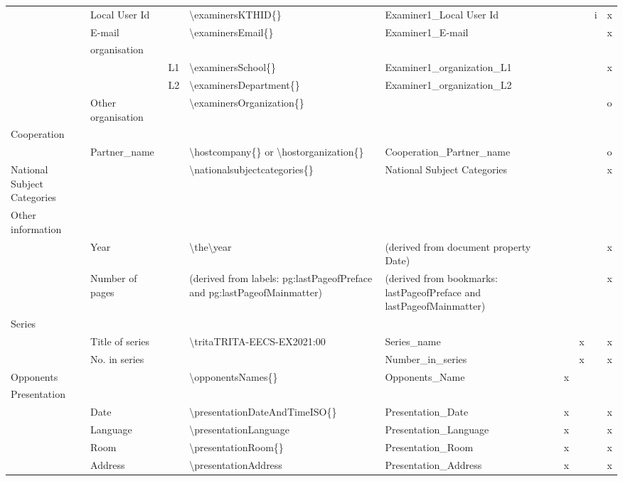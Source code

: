 \begin{landscape}
{\begin{longtable}{L{2cm}|L{4cm}|l|L{4cm}|L{4cm}|l l l l|}
 & Local User Id &  & \textbackslash examinersKTHID\{\} & Examiner1\_Local User Id &  &  & i & x \\
 & E-mail &  & \textbackslash examinersEmail\{\} & Examiner1\_E-mail &  &  &  & x \\
 & organisation & \\
 &  & L1 & \textbackslash examinersSchool\{\} & Examiner1\_organization\_L1 &  &  &  & x \\
 &  & L2 & \textbackslash examinersDepartment\{\} & Examiner1\_organization\_L2 &  &  &  & \\
 & Other organisation &  & \textbackslash examinersOrganization\{\} &  &  &  &  & o \\
 \hline
{}Cooperation & \\
 & Partner\_name &  & \textbackslash hostcompany\{\}        or \textbackslash hostorganization\{\} & Cooperation\_Partner\_name &  &  &  & o \\
  \hline
National Subject Categories &  &  & \textbackslash nationalsubjectcategories\{\} & National Subject Categories &  &  &  & x \\
 \hline
Other information & \\
 & Year &  & \textbackslash the\textbackslash year & (derived from document property Date) &  &  &  & x \\
 & Number of pages &  & (derived from labels: pg:lastPageofPreface and pg:lastPageofMainmatter) & (derived from bookmarks: lastPageofPreface and lastPageofMainmatter) &  &  &  & x \\
Series & \\
 & Title of series &  & \textbackslash trita{TRITA-EECS-EX}{2021:00} & Series\_name &  & x &  & x \\
 & No. in series &  &  & Number\_in\_series &  & x &  & x \\
Opponents &  &  & \textbackslash opponentsNames\{\} & Opponents\_Name & x &  &  & \\
Presentation & \\
 & Date &  & \textbackslash presentationDateAndTimeISO\{\} & Presentation\_Date & x &  &  & x \\
 & Language &  & \textbackslash presentationLanguage{ } & Presentation\_Language & x &  &  & x \\
 & Room &  & \textbackslash presentationRoom\{\} & Presentation\_Room & x &  &  & x \\
 & Address &  & \textbackslash presentationAddress{ } & Presentation\_Address & x &  &  & x \\

\end{longtable}}
\end{landscape}
